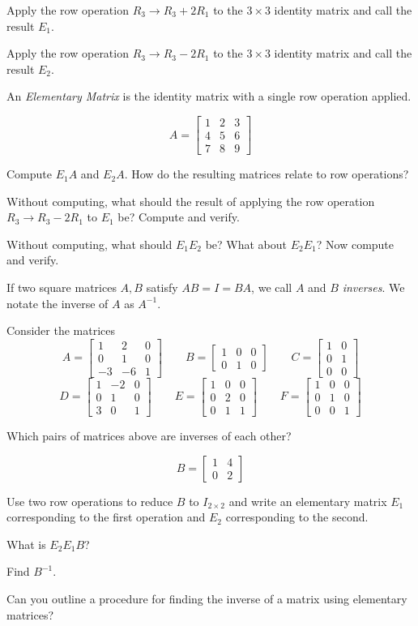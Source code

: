 \documentclass{article}
\newcommand{\mat}[1]{\begin{bmatrix}#1\end{bmatrix}}
\begin{document}
	\begin{Enum}
		\item Apply the row operation $R_3\to R_3+2R_1$ to the $3\times 3$ identity
		matrix and call the result $E_1$.
		\item Apply the row operation $R_3\to R_3-2R_1$ to the $3\times 3$ identity
		matrix and call the result $E_2$.
	\end{Enum}
	An \emph{Elementary Matrix} is the identity matrix with a single row operation applied.

	\[
		A=\mat{1&2&3\\4&5&6\\7&8&9}
	\]
	\begin{Enum}[resume]
		\item Compute $E_1A$ and $E_2A$.  How do the resulting matrices relate to row
		operations?
		\item Without computing, what should the result of applying the row
		operation $R_3\to R_3-2R_1$ to $E_1$ be?  Compute and verify.
		\item Without computing, what should $E_1E_2$ be?  What about $E_2E_1$?
		Now compute and verify.
	\end{Enum}

	If two square matrices $A,B$ satisfy $AB=I=BA$, we call $A$ and $B$ \emph{inverses}.
	We notate the inverse of $A$ as $A^{-1}$.

	Consider the matrices 
	\[
		A=\mat{1&2&0\\0&1&0\\-3&-6&1}\qquad
		B=\mat{1&0&0\\0&1&0}\qquad
		C=\mat{1&0\\0&1\\0&0}
	\]
	\[
		D=\mat{1&-2&0\\0&1&0\\3&0&1}\qquad
		E=\mat{1&0&0\\0&2&0\\0&1&1}\qquad
		F=\mat{1&0&0\\0&1&0\\0&0&1}
	\]
	\begin{Enum}
		\item Which pairs of matrices above are inverses of each other?
	\end{Enum}

	\[
		B=\mat{1 &4\\0 &2}
	\]
	\begin{Enum}
		\item Use two row operations to reduce $B$ to $I_{2\times 2}$
		and write an elementary matrix $E_1$ corresponding to the first operation
		and $E_2$ corresponding to the second.
		\item What is $E_2E_1B$?
		\item Find $B^{-1}$.
		\item Can you outline a procedure for finding the inverse of a matrix
		using elementary matrices?
	\end{Enum}
\end{document}
